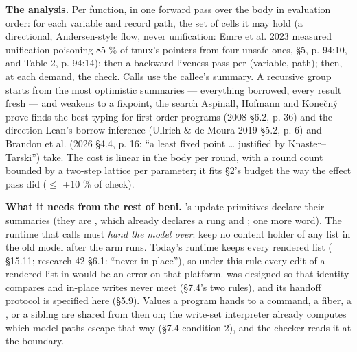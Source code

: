 \textbf{The analysis.} Per function, in one forward pass over the body in evaluation order: for each variable and record path, the set of cells it may hold (a directional, Andersen-style flow, never unification: Emre et al. 2023 measured unification poisoning 85 \% of tmux's pointers from four unsafe ones, §5, p. 94:10, and Table 2, p. 94:14); then a backward liveness pass per (variable, path); then, at each demand, the check. Calls use the callee's summary. A recursive group starts from the most optimistic summaries — everything borrowed, every result fresh — and weakens to a fixpoint, the search Aspinall, Hofmann and Konečný prove finds the best typing for first-order programs (2008 §6.2, p. 36) and the direction Lean's borrow inference (Ullrich \& de Moura 2019 §5.2, p. 6) and Brandon et al. (2026 §4.4, p. 16: “a least fixed point … justified by Knaster–Tarski”) take. The cost is linear in the body per round, with a round count bounded by a two-step lattice per parameter; it fits  §2's budget the way the effect pass did ($\le$ +10 \% of check).

\textbf{What it needs from the rest of beni.} 's update primitives declare their summaries (they are , which already declares a rung and ; one more word). The runtime that calls  must \emph{hand the model over}: keep no content holder of any list in the old model after the arm runs. Today's  runtime keeps every rendered list ( §15.11; research 42 §6.1: “never in place”), so under this rule every edit of a rendered list in  would be an error on that platform.  was designed so that identity compares and in-place writes never meet (§7.4's two rules), and its handoff protocol is specified here (§5.9). Values a program hands to a command, a fiber, a ,  or a sibling are shared from then on; the write-set interpreter already computes which model paths escape that way (§7.4 condition 2), and the checker reads it at the boundary.

